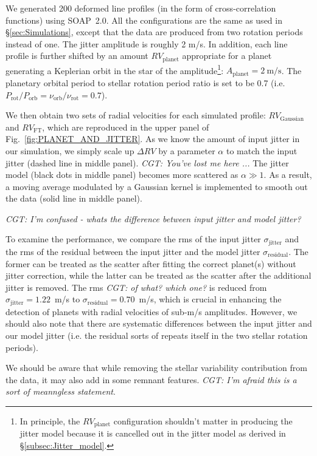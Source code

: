 We generated 200 deformed line profiles (in the form of cross-correlation functions) using SOAP~2.0. All the configurations are the same as used in \S\ref{sec:Simulations}, except that the data are produced from two rotation periods instead of one. The jitter amplitude is roughly 2 m/s. In addition, each line profile is further shifted by an amount $RV_\text{planet}$ appropriate for a planet generating a Keplerian orbit in the star of the amplitude\footnote{In principle, the $RV_\text{planet}$ configuration shouldn't matter in producing the jitter model because it is cancelled out in the jitter model as derived in \S\ref{subsec:Jitter_model}.}: $A_\text{planet} = 2~\text{m/s}$. The planetary orbital period to stellar rotation period ratio is set to be 0.7 (i.e. $P_\text{rot}/P_\text{orb} =\nu_\text{orb}/\nu_\text{rot}= 0.7$). 

We then obtain two sets of radial velocities for each simulated profile: 
$RV_\text{Gaussian}$ and $RV_\text{FT}$, which are reproduced in the upper panel of Fig.~\ref{fig:PLANET_AND_JITTER}. 
As we know the amount of input jitter in our simulation, we simply scale up $\Delta RV$ by a parameter $\alpha$
to match the input jitter (dashed line in middle panel). {\em CGT: You've lost me here ...}
The jitter model (black dots in middle panel) becomes more scattered as $\alpha \gg 1$.  
As a result, a moving average modulated by a Gaussian kernel is implemented to smooth out the data (solid line 
in middle panel).

{\em CGT: I'm confused - whats the difference between input jitter and model jitter?}

To examine the performance, we compare the rms of the input jitter $\sigma_\text{jitter}$
and the rms of the residual between the input jitter and the model jitter $\sigma_\text{residual}$. 
The former can be treated as the scatter after fitting the correct planet(s) without jitter correction, 
while the latter can be treated as the scatter after the additional jitter is removed.
The rms {\em CGT: of what? which one?} is reduced from $\sigma_\text{jitter} = 1.22$~m/s to $\sigma_\text{residual} = 0.70$~m/s,
which is crucial in enhancing the detection of planets with radial velocities of sub-m/s amplitudes. 
However, we should also note that there are systematic differences between the input jitter and our model jitter
(i.e. the residual sorts of repeats itself in the two stellar rotation periods). 

We should be aware that 
while removing the stellar variability contribution from the data, it may also add in some remnant features. 
{\em CGT: I'm afraid this is a sort of meanngless statement}.

